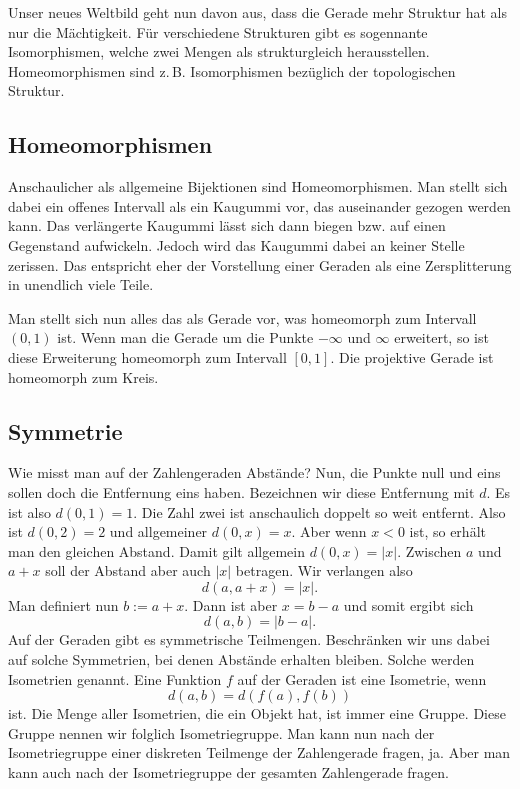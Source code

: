 \documentclass[a4paper,11pt,fleqn,twocolumn,twoside]{article}
\begin{document}
Unser neues Weltbild geht nun davon aus, dass die Gerade mehr
Struktur hat als nur die Mächtigkeit. Für verschiedene Strukturen
gibt es sogennante Isomorphismen, welche zwei Mengen als strukturgleich
herausstellen. Homeomorphismen sind z.\,B. Isomorphismen bezüglich der
topologischen Struktur.


\subsection{Homeomorphismen}

Anschaulicher als allgemeine Bijektionen sind Homeomorphismen. Man
stellt sich dabei ein offenes Intervall als ein Kaugummi vor, das
auseinander gezogen werden kann. Das verlängerte Kaugummi lässt sich
dann biegen bzw. auf einen Gegenstand aufwickeln. Jedoch wird das
Kaugummi dabei an keiner Stelle zerissen. Das entspricht eher der
Vorstellung einer Geraden als eine Zersplitterung in unendlich
viele Teile.

Man stellt sich nun alles das als Gerade vor, was homeomorph zum
Intervall $(0,1)$ ist. Wenn man die Gerade um die Punkte
$-\infty$ und $\infty$ erweitert, so ist diese Erweiterung
homeomorph zum Intervall $[0,1]$. Die projektive Gerade ist
homeomorph zum Kreis.

\subsection{Symmetrie}

Wie misst man auf der Zahlengeraden Abstände? Nun, die Punkte null
und eins sollen doch die Entfernung eins haben. Bezeichnen wir
diese Entfernung mit $d$. Es ist also $d(0,1)=1$. Die Zahl zwei
ist anschaulich doppelt so weit entfernt. Also ist $d(0,2)=2$ und
allgemeiner $d(0,x)=x$. Aber wenn $x<0$ ist, so erhält man den
gleichen Abstand. Damit gilt allgemein $d(0,x)=|x|$. Zwischen $a$
und $a+x$ soll der Abstand aber auch $|x|$ betragen. Wir verlangen
also
\begin{equation}
d(a,a+x)=|x|.
\end{equation}
Man definiert nun $b:=a+x$. Dann ist aber $x=b-a$ und somit ergibt sich
\begin{equation}
d(a,b)=|b-a|.
\end{equation}
Auf der Geraden gibt es symmetrische Teilmengen. Beschränken wir uns
dabei auf solche Symmetrien, bei denen Abstände erhalten bleiben.
Solche werden Isometrien genannt. Eine Funktion $f$ auf der Geraden
ist eine Isometrie, wenn
\begin{equation}
d(a,b)=d(f(a),f(b))
\end{equation}
ist. Die Menge aller Isometrien, die ein Objekt hat, ist immer eine
Gruppe. Diese Gruppe nennen wir folglich Isometriegruppe. Man kann nun
nach der Isometriegruppe einer diskreten Teilmenge der Zahlengerade
fragen, ja. Aber man kann auch nach der Isometriegruppe der gesamten
Zahlengerade fragen.
\end{document}
